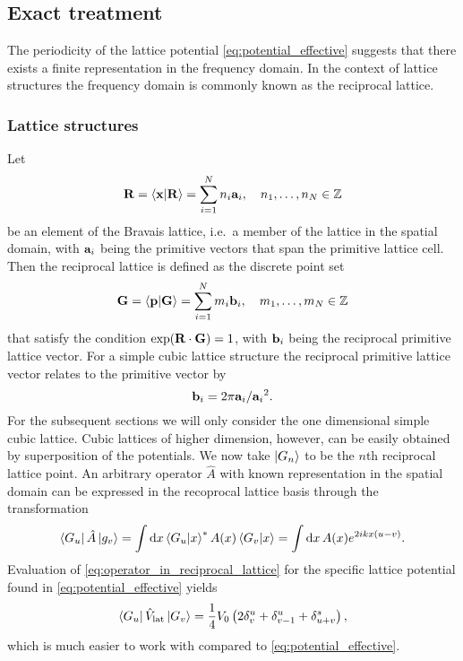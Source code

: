 \subsection{Exact treatment}

The periodicity of the lattice potential \cref{eq:potential_effective}
suggests that there exists a finite representation in the frequency domain.
In the context of lattice structures the frequency domain is commonly known
as the reciprocal lattice.

\subsubsection{Lattice structures}

Let
\begin{equation}
  \vb{R}
  =\bra{\vb{x}}\ket{\vb{R}}
  =\sum_{i=1}^Nn_i\vb{a}_i
  \qc n_1,\dots,n_N\in\mathbb{Z}
\end{equation}
be an element of the Bravais lattice, i.e.\ a member of the lattice in the
spatial domain, with $\vb{a}_i$ being the primitive vectors that span the
primitive lattice cell. Then the reciprocal lattice is defined as the discrete
point set
\begin{equation}
  \vb{G}
  =\bra{\vb{p}}\ket{\vb{G}}
  =\sum_{i=1}^Nm_i\vb{b}_i
  \qc m_1,\dots,m_N\in\mathbb{Z}
\end{equation}
that satisfy the condition $\exp(\vb{R}\cdot\vb{G})=1$, with $\vb{b}_i$ being
the reciprocal primitive lattice vector. For a simple cubic lattice structure
the reciprocal primitive lattice vector relates to the primitive vector by
\begin{equation}
  \vb{b}_i
  =2\pi\vb{a}_i/{{\vb{a}_i}^2}.
\end{equation}
For the subsequent sections we will only consider the one dimensional simple
cubic lattice. Cubic lattices of higher dimension, however, can be easily
obtained by superposition of the potentials. We now take $\ket{G_n}$ to be
the $n$th reciprocal lattice point. An arbitrary operator $\hat{A}$ with
known representation in the spatial domain can be expressed in the recoprocal
lattice basis through the transformation
\begin{equation}
  \bra{G_u}\hat{A}\ket{g_v}
  =\int\dd{x}\bra{G_u}\ket{x}^*A(x)\bra{G_v}\ket{x}
  =\int\dd{x}A(x)e^{2ikx(u-v)}
  \label{eq:operator_in_reciprocal_lattice}.
\end{equation}
Evaluation of \cref{eq:operator_in_reciprocal_lattice} for the specific
lattice potential found in \cref{eq:potential_effective} yields
\begin{equation}
  \bra{G_u}\hat{V}_\text{lat}\ket{G_v}
  =\frac{1}{4}V_0\left(2\delta^u_v+\delta^u_{v-1}+\delta^s_{u+v}\right),
  \label{eq:elements_effective_potential_in_reciprocal_state}
\end{equation}
which is much easier to work with compared to \cref{eq:potential_effective}.

